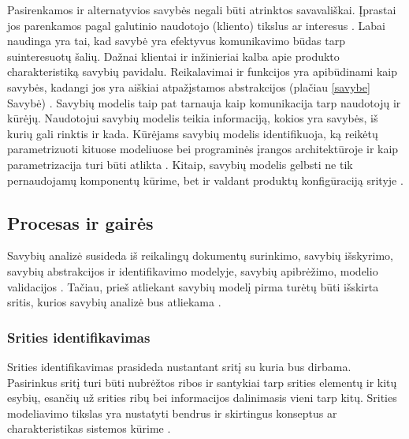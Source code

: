 \documentclass{VUMIFPSkursinis}
\begin{document}
Pasirenkamos ir alternatyvios savybės negali būti atrinktos savavališkai. Įprastai jos parenkamos pagal galutinio naudotojo (kliento) tikslus ar interesus \cite{Kang1990}. Labai naudinga yra tai, kad savybė yra efektyvus komunikavimo būdas tarp suinteresuotų šalių. Dažnai klientai ir inžinieriai kalba apie produkto charakteristiką savybių pavidalu. Reikalavimai ir funkcijos yra apibūdinami kaip savybės, kadangi jos yra aiškiai atpažįstamos abstrakcijos (plačiau \ref{savybe} Savybė) \cite{Lee2015}. Savybių modelis taip pat tarnauja kaip komunikacija tarp naudotojų ir kūrėjų. Naudotojui savybių modelis teikia informaciją, kokios yra savybės, iš kurių gali rinktis ir kada. Kūrėjams savybių modelis identifikuoja, ką reikėtų parametrizuoti kituose modeliuose bei programinės įrangos architektūroje ir kaip parametrizacija turi būti atlikta \cite{Kang1990}. Kitaip, savybių modelis gelbsti ne tik pernaudojamų komponentų kūrime, bet ir valdant produktų konfigūraciją srityje \cite{Lee2015}.



\subsection{Procesas ir gairės} \label{procesas}

Savybių analizė susideda iš reikalingų dokumentų surinkimo, savybių išskyrimo, savybių abstrakcijos ir identifikavimo modelyje, savybių apibrėžimo, modelio validacijos \cite{Kang1990}. Tačiau, prieš atliekant savybių modelį pirma turėtų būti išskirta sritis, kurios savybių analizė bus atliekama \cite{Lee2015}. 

\subsubsection{Srities identifikavimas}

Srities identifikavimas prasideda nustantant sritį su kuria bus dirbama. Pasirinkus sritį turi būti nubrėžtos ribos ir santykiai tarp srities elementų ir kitų esybių, esančių už srities ribų bei informacijos dalinimasis vieni tarp kitų. Srities modeliavimo tikslas yra nustatyti bendrus ir skirtingus konseptus ar charakteristikas sistemos kūrime \cite{Lee2015}.  
\end{document}

